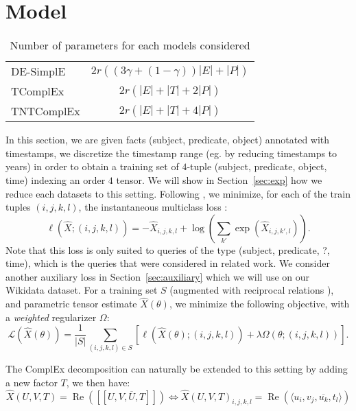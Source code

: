 \documentclass{article}
\newcommand{\empx}{\hat{X}}
\newcommand{\brck}[1]{[\![#1]\!]}
\begin{document}
\section{Model}
\begin{table}[t]
\centering
\begin{tabular}{lc}
\toprule
DE-SimplE & $2r\left((3\gamma + (1-\gamma))|E|+ |P|\right)$ \\
TComplEx & $2r(|E|+|T|+2|P|)$ \\
TNTComplEx & $2r(|E|+|T|+4|P|)$ \\
\bottomrule
\end{tabular}
\caption{Number of parameters for each models considered}
\label{tab:n_params}
\end{table}
In this section, we are given facts (subject, predicate, object) annotated with timestamps, we discretize the timestamp range (eg. by reducing timestamps to years) in order to obtain a training set of $4$-tuple (subject, predicate, object, time) indexing an order $4$ tensor. We will show in Section~\ref{sec:exp} how we reduce each datasets to this setting. Following \citet{lacroix2018canonical}, we minimize, for each of the train tuples $(i,j,k,l)$, the instantaneous multiclass loss : 
\begin{equation}
    \ell(\empx;(i,j,k,l)) = - \empx_{i,j,k,l} + \log\left(\sum_{k'}\exp\left(\empx_{i,j,k',l}\right)\right).
    \label{eq:inst_loss}
\end{equation}
Note that this loss is only suited to queries of the type (subject, predicate, ?, time), which is the queries that were considered in related work. We consider another auxiliary loss in Section~\ref{sec:auxiliary} which we will use on our Wikidata dataset.
For a training set $S$ (augmented with reciprocal relations \citep{lacroix2018canonical, kazemi2018simple}), and parametric tensor estimate $\empx(\theta)$, we minimize the following objective, with a \emph{weighted} regularizer $\Omega$:
\begin{equation}
    \mathcal{L}(\empx(\theta)) = \frac{1}{|S|}\sum_{(i,j,k,l)\in S}\left[\ell(\empx(\theta);(i,j,k,l)) + \lambda\Omega(\theta; (i,j,k,l))\right].
\end{equation}

The ComplEx \citep{trouillon_complex_2016} decomposition can naturally be extended to this setting by adding a new factor $T$, we then have:
\begin{equation}
    \empx(U, V, T) = \operatorname{Re}\left(\brck{U,V,\overline{U}, T} \right)\iff \empx(U,V,T)_{i,j,k,l} = \operatorname{Re}\left(\langle u_i, v_j, \overline{u_k}, t_l\rangle\right)
    \label{eq:complex}
\end{equation}
\end{document}
